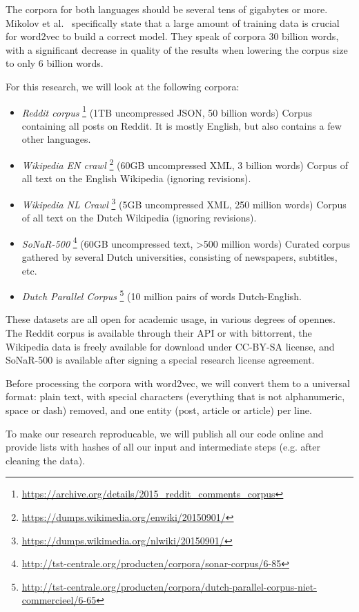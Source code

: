 The corpora for both languages should be several tens of gigabytes or more. Mikolov et al.~\cite{mikolov2013distributed} specifically state that a large amount of training data is crucial for word2vec to build a correct model. They speak of corpora 30 billion words, with a significant decrease in quality of the results when lowering the corpus size to only 6 billion words.

For this research, we will look at the following corpora:
\begin{itemize}
  \item \textit{Reddit corpus}
    \footnote{\url{https://archive.org/details/2015_reddit_comments_corpus}}
    (1TB uncompressed JSON, 50 billion words) Corpus containing all posts on Reddit. It is mostly English, but also contains a few other languages.
  \item \textit{Wikipedia EN crawl} 
    \footnote{\url{https://dumps.wikimedia.org/enwiki/20150901/}}
    (60GB uncompressed XML, 3 billion words) Corpus of all text on the English Wikipedia (ignoring revisions).
  \item \textit{Wikipedia NL Crawl} 
    \footnote{\url{https://dumps.wikimedia.org/nlwiki/20150901/}}
    (5GB uncompressed XML, 250 million words) Corpus of all text on the Dutch Wikipedia (ignoring revisions).
  \item \textit{SoNaR-500} 
    \footnote{\url{http://tst-centrale.org/producten/corpora/sonar-corpus/6-85}}
    (60GB uncompressed text, >500 million words) Curated corpus gathered by several Dutch universities, consisting of newspapers, subtitles, etc.
  \item \textit{Dutch Parallel Corpus} 
    \footnote{\url{http://tst-centrale.org/producten/corpora/dutch-parallel-corpus-niet-commercieel/6-65}}
    (10 million pairs of words Dutch-English.
\end{itemize}

These datasets are all open for academic usage, in various degrees of opennes. The Reddit corpus is available through their API or with bittorrent, the Wikipedia data is freely available for download under CC-BY-SA license, and SoNaR-500 is available after signing a special research license agreement.

Before processing the corpora with word2vec, we will convert them to a universal format: plain text, with special characters (everything that is not alphanumeric, space or dash) removed, and one entity (post, article or article) per line.

To make our research reproducable, we will publish all our code online and provide lists with hashes of all our input and intermediate steps (e.g. after cleaning the data).